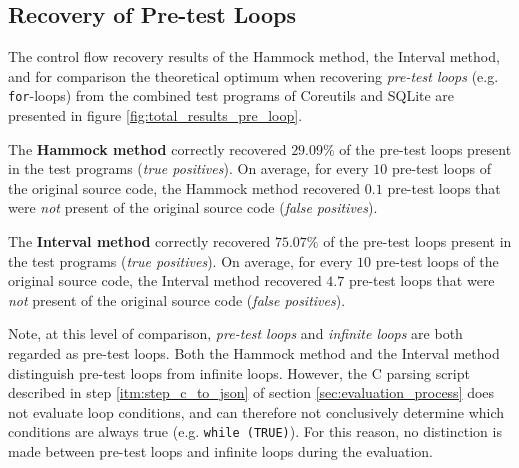 
\subsection{Recovery of Pre-test Loops}
\label{sec:recovery_of_pre_test_loops}

The control flow recovery results of the Hammock method, the Interval method, and for comparison the theoretical optimum when recovering \textit{pre-test loops} (e.g. \texttt{for}-loops) from the combined test programs of Coreutils and SQLite are presented in figure \ref{fig:total_results_pre_loop}.

The \textbf{Hammock method} correctly recovered $29.09\%$ of the pre-test loops present in the test programs (\textit{true positives}). On average, for every $10$ pre-test loops of the original source code, the Hammock method recovered $0.1$ pre-test loops that were \textit{not} present of the original source code (\textit{false positives}).

The \textbf{Interval method} correctly recovered $75.07\%$ of the pre-test loops present in the test programs (\textit{true positives}). On average, for every $10$ pre-test loops of the original source code, the Interval method recovered $4.7$ pre-test loops that were \textit{not} present of the original source code (\textit{false positives}).

Note, at this level of comparison, \textit{pre-test loops} and \textit{infinite loops} are both regarded as pre-test loops. Both the Hammock method and the Interval method distinguish pre-test loops from infinite loops. However, the C parsing script described in step \ref{itm:step_c_to_json} of section \ref{sec:evaluation_process} does not evaluate loop conditions, and can therefore not conclusively determine which conditions are always true (e.g. \texttt{while (TRUE)}). For this reason, no distinction is made between pre-test loops and infinite loops during the evaluation.

